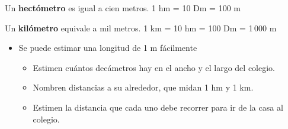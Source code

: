 \documentclass[letterpaper,11pt,twoside]{article}
\begin{document}
\begin{multicols}{2}
Un \textbf{hectómetro} es igual a cien metros. 1 hm = 10 Dm = 100 m

Un \textbf{kilómetro} equivale a mil metros. 1 km = 10 hm = 100 Dm = 1\,000 m
\begin{itemize}
\item Se puede estimar una longitud de 1 m fácilmente
\begin{itemize}
\item Estimen cuántos decámetros hay en el ancho y el largo del colegio.
\item Nombren distancias a su alrededor, que midan 1 hm y 1 km.
\item Estimen la distancia que cada uno debe recorrer para ir de la casa al colegio.
\end{itemize}
\end{itemize}
\end{multicols}
\end{document}
